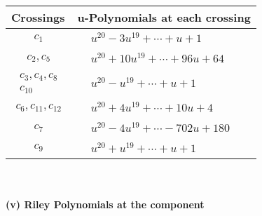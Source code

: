\documentclass[1p]{elsarticle_modified}
\theoremstyle{definition}
\begin{document}
\begin{tabular}{m{50pt}|m{274pt}}
Crossings & \hspace{64pt}u-Polynomials at each crossing \\
\hline $$\begin{aligned}c_{1}\end{aligned}$$&$\begin{aligned}
&u^{20}-3 u^{19}+\cdots+u+1
\end{aligned}$\\
\hline $$\begin{aligned}c_{2},c_{5}\end{aligned}$$&$\begin{aligned}
&u^{20}+10 u^{19}+\cdots+96 u+64
\end{aligned}$\\
\hline $$\begin{aligned}c_{3},c_{4},c_{8}\\c_{10}\end{aligned}$$&$\begin{aligned}
&u^{20}- u^{19}+\cdots+u+1
\end{aligned}$\\
\hline $$\begin{aligned}c_{6},c_{11},c_{12}\end{aligned}$$&$\begin{aligned}
&u^{20}+4 u^{19}+\cdots+10 u+4
\end{aligned}$\\
\hline $$\begin{aligned}c_{7}\end{aligned}$$&$\begin{aligned}
&u^{20}-4 u^{19}+\cdots-702 u+180
\end{aligned}$\\
\hline $$\begin{aligned}c_{9}\end{aligned}$$&$\begin{aligned}
&u^{20}+u^{19}+\cdots+u+1
\end{aligned}$\\
\hline
\end{tabular}\\~\\
\newpage\renewcommand{\arraystretch}{1}
\flushleft \textbf{(v) Riley Polynomials at the component}\newline \\
\end{document}
